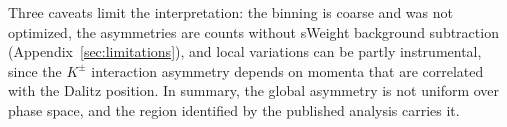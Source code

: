 Three caveats limit the interpretation: the binning is coarse and was not optimized, the asymmetries are counts without sWeight background subtraction (Appendix~\ref{sec:limitations}), and local variations can be partly instrumental, since the $K^\pm$ interaction asymmetry depends on momenta that are correlated with the Dalitz position. In summary, the global asymmetry is not uniform over phase space, and the region identified by the published analysis carries it.




